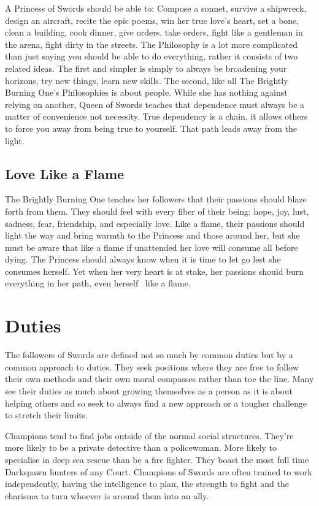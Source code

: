 A Princess of Swords should be able to: Compose a sonnet, survive a shipwreck, design an aircraft, recite the epic poems, win her true love's heart, set a bone, clean a building, cook dinner, give orders, take orders, fight like a gentleman in the arena, fight dirty in the streets. The Philosophy is a lot more complicated than just saying you should be able to do everything, rather it consists of two related ideas. The first and simpler is simply to always be broadening your horizons, try new things, learn new skills. The second, like all The Brightly Burning One's Philosophies is about people. While she has nothing against relying on another, Queen of Swords teaches that dependence must always be a matter of convenience not necessity. True dependency is a chain, it allows others to force you away from being true to yourself. That path leads away from the light. 

\subsection*{Love Like a Flame}

The Brightly Burning One teaches her followers that their passions should blaze forth from them. They should feel with every fiber of their being: hope, joy, lust, sadness, fear, friendship, and especially love. Like a flame, their passions should light the way and bring warmth to the Princess and those around her, but she must be aware that like a flame if unattended her love will consume all before dying. The Princess should always know when it is time to let go lest she consumes herself. Yet when her very heart is at stake, her passions should burn everything in her path, even herself \textendash\, like a flame. 

\section*{Duties}

The followers of Swords are defined not so much by common duties but by a common approach to duties. They seek positions where they are free to follow their own methods and their own moral compasses rather than toe the line. Many see their duties as much about growing themselves as a person as it is about helping others and so seek to always find a new approach or a tougher challenge to stretch their limits.

Champions tend to find jobs outside of the normal social structures. They're more likely to be a private detective than a policewoman. More likely to specialise in deep sea rescue than be a fire fighter. They boast the most full time Darkspawn hunters of any Court. Champions of Swords are often trained to work independently, having the intelligence to plan, the strength to fight and the charisma to turn whoever is around them into an ally.

